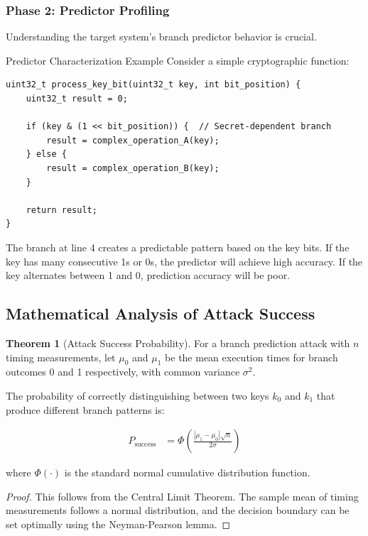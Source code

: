 \documentclass[11pt,a4paper]{article}
\theoremstyle{definition}
\newtheorem{theorem}{Theorem}[section]
\begin{document}
\subsubsection{Phase 2: Predictor Profiling}

Understanding the target system's branch predictor behavior is crucial.

\begin{examplebox}{Predictor Characterization Example}
Consider a simple cryptographic function:

\lstset{language=C}
\begin{lstlisting}
uint32_t process_key_bit(uint32_t key, int bit_position) {
    uint32_t result = 0;
    
    if (key & (1 << bit_position)) {  // Secret-dependent branch
        result = complex_operation_A(key);
    } else {
        result = complex_operation_B(key);
    }
    
    return result;
}
\end{lstlisting}

The branch at line 4 creates a predictable pattern based on the key bits. If the key has many consecutive 1s or 0s, the predictor will achieve high accuracy. If the key alternates between 1 and 0, prediction accuracy will be poor.
\end{examplebox}

\subsection{Mathematical Analysis of Attack Success}

\begin{theorem}[Attack Success Probability]
For a branch prediction attack with $n$ timing measurements, let $\mu_0$ and $\mu_1$ be the mean execution times for branch outcomes 0 and 1 respectively, with common variance $\sigma^2$.

The probability of correctly distinguishing between two keys $k_0$ and $k_1$ that produce different branch patterns is:

\begin{align}
P_{\text{success}} &= \Phi\left(\frac{|\mu_1 - \mu_0|\sqrt{n}}{2\sigma}\right)
\end{align}

where $\Phi(\cdot)$ is the standard normal cumulative distribution function.
\end{theorem}

\begin{proof}
This follows from the Central Limit Theorem. The sample mean of timing measurements follows a normal distribution, and the decision boundary can be set optimally using the Neyman-Pearson lemma.
\end{proof}
\end{document}
